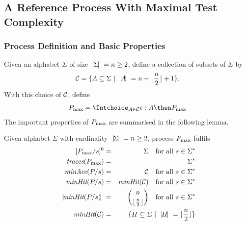 \subsection{A Reference Process With Maximal Test Complexity}


\subsubsection*{Process Definition and Basic Properties}
Given an alphabet $\Sigma$ of size ${~|\! \Sigma\!|~} = n\ge 2$, define
a collection of subsets of $\Sigma$ by
\begin{equation}\label{eq:defC}
{\cal C} = \{ A\subseteq\Sigma~|~{~|\! A\!|~} = n - \lfloor\frac{n}{2}\rfloor + 1 \}.
\end{equation}
%
With this choice of ${\cal C}$, define
\begin{equation}\label{eq:pmax}
\pmax = \Intchoice_{A\in{\cal C}} e:A\then \pmax
\end{equation}
%
The important properties of $P_\text{max}$ are summarised in the following lemma.
%
\begin{lemma}\label{lemma:pmax}
Given alphabet $\Sigma$ with cardinality ${~|\! \Sigma\!|~} = n\ge 2$,
process $P_\text{max}$ fulfils
%
\begin{eqnarray}
{}[P_\text{max}/s]^0 & = & \Sigma \quad\text{for all $s\in \Sigma^*$}
\label{eq:pmaxa}
\\
\text{\it traces}(P_\text{max}) & = & \Sigma^*
\label{eq:pmaxb}
\\
\text{\it minAcc}(P/s) & = & {\cal C} \quad\text{for all $s\in \Sigma^*$}
\label{eq:pmaxc}
\\
\text{\it minHit}(P/s) & = & \text{\it minHit}({\cal C}) \quad\text{for all $s\in \Sigma^*$}
\label{eq:pmaxe}
\\
{~|\! \text{\it minHit}(P/s)\!|~} & = & \binom{n}{\lfloor\frac{n}{2}\rfloor} 
\quad \text{for all $s\in \Sigma^*$}
\label{eq:pmaxd}
\\
\text{\it minHit}({\cal C})  & = & \{ H\subseteq \Sigma~|~{~|\! H\!|~} = \lfloor\frac{n}{2}\rfloor\}
\label{eq:pmaxf}
\end{eqnarray}
\end{lemma}
